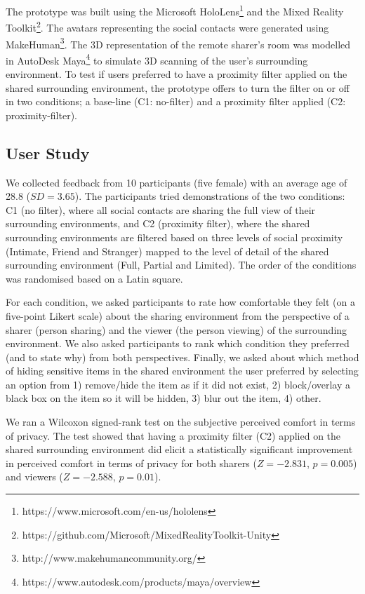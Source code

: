 The prototype was built using the Microsoft HoloLens\footnote{https://www.microsoft.com/en-us/hololens} and the Mixed Reality Toolkit\footnote{https://github.com/Microsoft/MixedRealityToolkit-Unity}. The avatars representing the social contacts were generated using MakeHuman\footnote{http://www.makehumancommunity.org/}. The 3D representation of the remote sharer's room was modelled in AutoDesk Maya\footnote{https://www.autodesk.com/products/maya/overview} to simulate 3D scanning of the user's surrounding environment. To test if users preferred to have a proximity filter applied on the shared surrounding environment, the prototype offers to turn the filter on or off in two conditions; a base-line (C1: no-filter) and a proximity filter applied (C2: proximity-filter).


\subsection{User Study}

We collected feedback from 10 participants (five female) with an average age of 28.8 ($SD=3.65$). The participants tried demonstrations of the two conditions: C1 (no filter), where all social contacts are sharing the full view of their surrounding environments, and C2 (proximity filter), where the shared surrounding environments are filtered based on three levels of social proximity (Intimate, Friend and Stranger) mapped to the level of detail of the shared surrounding environment (Full, Partial and Limited). The order of the conditions was randomised based on a Latin square. 

For each condition, we asked participants to rate how comfortable they felt (on a five-point Likert scale) about the sharing environment from the perspective of a sharer (person sharing) and the viewer (the person viewing) of the surrounding environment. We also asked participants to rank which condition they preferred (and to state why) from both perspectives. Finally, we asked about which method of hiding sensitive items in the shared environment the user preferred by selecting an option from 1) remove/hide the item as if it did not exist, 2) block/overlay a black box on the item so it will be hidden, 3) blur out the item, 4) other. 

We ran a Wilcoxon signed-rank test on the subjective perceived comfort in terms of privacy. The test showed that having a proximity filter (C2) applied on the shared surrounding environment did elicit a statistically significant improvement in perceived comfort in terms of privacy for both sharers ($Z=-2.831$, $p=0.005$) and viewers ($Z=-2.588$, $p=0.01$). 

